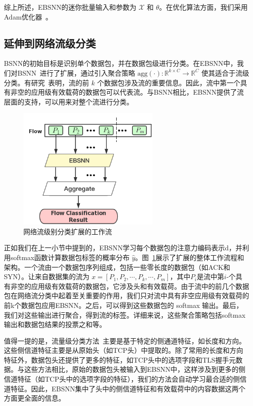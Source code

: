 \documentclass[degree=master,cjk-font=noto]{thuthesis}
\begin{document}
综上所述，EBSNN的迷你批量输入和参数为 $\mathcal{X}$ 和 $\theta$。在优化算法方面，我们采用Adam优化器~\cite{Adam}。

\subsection{延伸到网络流级分类}
\label{flow}

BSNN的初始目标是识别单个数据包，并在数据包级进行分类。在EBSNN中，我们对BSNN~\cite{bsnn}进行了扩展，通过引入聚合策略 $\text{agg}(\cdot): \mathbb{R}^{k \times C} \rightarrow \mathbb{R}^{C}$ 使其适合于流级分类。有研究~\cite{b12, MAAF}表明，流的前 $k$ 个数据包涉及流的重要信息。因此，流中第一个具有非空的应用级有效载荷的数据包可以代表流。与BSNN相比，EBSNN提供了流层面的支持，可以用来对整个流进行分类。

\begin{figure}[!tp]
	\centerline{\includegraphics[width=7cm]{BSNN_Extension_Flow.png}}
	\caption{网络流级别分类扩展的工作流}
	\label{fig_extension_flow}
\end{figure}

正如我们在上一小节中提到的，EBSNN学习每个数据包的注意力编码表示d，并利用softmax函数计算数据包标签的概率分布 $\hat{y}$。图~\ref{fig_extension_flow}展示了扩展的整体工作流程和架构。一个流由一个数据包序列组成，包括一些零长度的数据包（如ACK和SYN）。让来自数据集的流为 $x = [P_1, P_2, \cdots, P_k, \cdots, P_m]$，其中$P_i$是流中第$i$-个具有非空的应用级有效载荷的数据包，它涉及头和有效载荷。由于流中的前几个数据包在网络流分类中起着至关重要的作用，我们只对流中具有非空应用级有效载荷的前k个数据包应用EBSNN。之后，可以得到这些数据包的 softmax 输出。最后，我们对这些输出进行聚合，得到流的标签。详细来说，这些聚合策略包括softmax输出和数据包结果的投票之和等。

值得一提的是，流量级分类方法~\cite{b12, MAAF}主要是基于特定的侧通道特征，如长度和方向。这些侧信道特征主要是从原始头（如TCP头）中提取的。除了常用的长度和方向特征外，数据包头还提供了更多的特征，如TCP头中的选项字段和TLS握手元数据。与这些方法相比，原始的数据包头被输入到EBSNN中，这样涉及到更多的侧信道特征（如TCP头中的选项字段的特征），我们的方法会自动学习最合适的侧信道特征。因此，EBSNN集中了头中的侧信道特征和有效载荷中的内容数据这两个方面更全面的信息。
\end{document}
